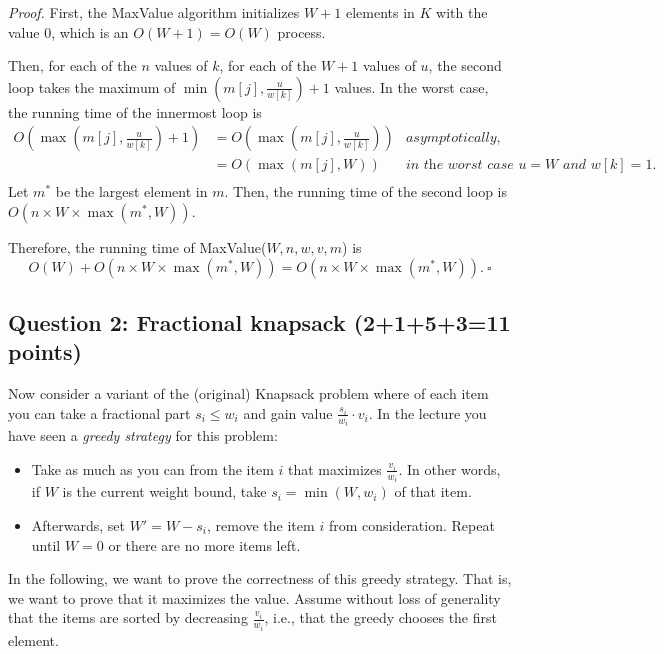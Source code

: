 \begin{enumerate}
\begin{solution}
\textit{Proof. }First, the {\sc MaxValue} algorithm initializes $W+1$ elements in $K$ with the value $0$, which is an $O(W+1)=O(W)$ process.

Then, for each of the $n$ values of $k$, for each of the $W+1$ values of $u$, the second loop takes the maximum of $\min\left(m[j],\frac{u}{w[k]}\right)+1$ values. In the worst case, the running time of the innermost loop is
\begin{align*}
O\left(\max\left(m[j],\frac{u}{w[k]}\right)+1\right)
&=O\left(\max\left(m[j],\frac{u}{w[k]}\right)\right)&\textit{asymptotically,}\\
&=O(\max(m[j],W))&\textit{in the worst case $u=W$ and $w[k]=1$.}\\
\end{align*}
Let $m^*$ be the largest element in $m$. Then, the running time of the second loop is $O(n\times W\times\max(m^*,W))$.

Therefore, the running time of {\sc MaxValue}($W,n,w,v,m$) is \[O(W)+O(n\times W\times\max(m^*,W))=O(n\times W\times\max(m^*,W)).~\square\]
\end{solution}
\end{enumerate}
\subsection*{Question 2: Fractional knapsack (2+1+5+3=11 points)}

Now consider a variant of the (original) Knapsack problem where of each item you can take a fractional part $s_i \leq w_i$ and gain value $\frac{s_i}{w_i} \cdot v_i$.
In the lecture you have seen a \emph{greedy strategy} for this problem:
\begin{itemize}
    \item Take as much as you can from the item $i$ that maximizes $\frac{v_i}{w_i}$. In other words, if $W$ is the current weight bound, take $s_i=\min(W,w_i)$ of that item.
    \item Afterwards, set $W' = W-s_i$, remove the item $i$ from consideration. Repeat until $W=0$ or there are no more items left.
\end{itemize}
In the following, we want to prove the correctness of this greedy strategy. That is, we want to prove that it maximizes the value. Assume without loss of generality that the items are sorted by decreasing $\frac{v_i}{w_i}$, i.e., that the greedy chooses the first element.

